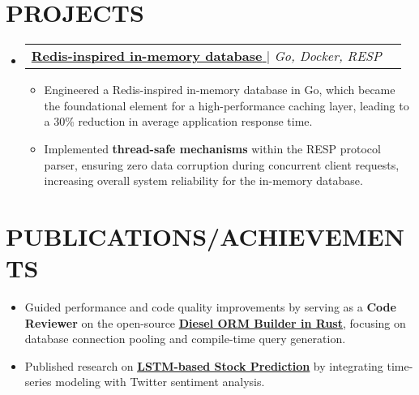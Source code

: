 \documentclass[letterpaper,10pt]{article}
\makeatletter
\newcommand{\resumeItem}[1]{
  \item\small{
    {#1}
  }
}
\newcommand{\resumeProjectHeading}[2]{
  \item
    \begin{tabular*}{1.0\textwidth}{l@{\extracolsep{\fill}}r}
      \normalsize#1 & \textbf{\small #2}
    \end{tabular*}
}
\newcommand{\resumeSubHeadingListStart}{\begin{itemize}[leftmargin=0.0in, label={}]}
\newcommand{\resumeSubHeadingListEnd}{\end{itemize}}
\newcommand{\resumeItemListStart}{\begin{itemize}}
\newcommand{\resumeItemListEnd}{\end{itemize}}
\makeatother
\begin{document}
\section{PROJECTS}
\resumeSubHeadingListStart   
  \resumeProjectHeading {\href{https://github.com/prkbuilds/redis-go}{\textbf{Redis-inspired in-memory database} \href{https://github.com/prkbuilds/redis-go}{\raisebox{-0.1\height}\faExternalLink }} $|$ \textit{Go, Docker, RESP}}{}
  \resumeItemListStart
    \resumeItem{\normalsize{Engineered a Redis-inspired in-memory database in Go, which became the foundational element for a high-performance caching layer, leading to a 30\% reduction in average application response time.}}
    \resumeItem{\normalsize{Implemented \textbf{thread-safe mechanisms} within the RESP protocol parser, ensuring zero data corruption during concurrent client requests, increasing overall system reliability for the in-memory database.}}
  \resumeItemListEnd
\resumeSubHeadingListEnd
\section{PUBLICATIONS/ACHIEVEMENTS}
\resumeItemListStart
  \resumeItem{\normalsize{Guided performance and code quality improvements by serving as a \textbf{Code Reviewer} on the open-source \href{https://github.com/diesel-rs/diesel}{\underline{\textbf{Diesel ORM Builder in Rust}}}, focusing on database connection pooling and compile-time query generation.}}
  \resumeItem{\normalsize{Published research on \href{https://www.springerprofessional.de/en/stock-market-trend-prediction-along-with-twitter-sentiment-analy/24659292}{\underline{\textbf{LSTM-based Stock Prediction}}} by integrating time-series modeling with Twitter sentiment analysis.}}
\resumeItemListEnd
\end{document}
